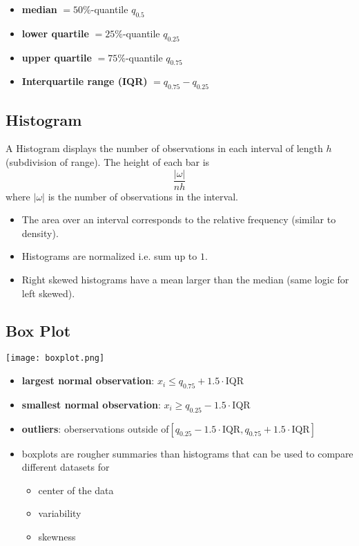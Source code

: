 \newpar{}
\begin{itemize}
    \item \textbf{median} $= 50\%$-quantile $q_{0.5}$
    \item \textbf{lower quartile} $= 25\%$-quantile $q_{0.25}$
    \item \textbf{upper quartile} $= 75\%$-quantile $q_{0.75}$
    \item \textbf{Interquartile range (IQR)} $= q_{0.75} - q_{0.25}$
\end{itemize}

\subsection{Histogram}
A Histogram displays the number of observations in each interval of length $h$ (subdivision of range).
The height of each bar is
\noindent\begin{equation*}
    \frac{|\omega|}{nh}
\end{equation*}
where $|\omega|$ is the number of observations in the interval.
\begin{itemize}
    \item The area over an interval corresponds to the relative frequency (similar to density).
    \item Histograms are normalized i.e. sum up to $1$.
    \item Right skewed histograms have a mean larger than the median (same logic for left skewed).
\end{itemize}

\subsection{Box Plot}
\begin{center}
    \texttt{[image: boxplot.png]}
\end{center}
\begin{itemize}
    \item \textbf{largest normal observation}: $x_i\leq q_{0.75}+1.5\cdot$IQR
    \item \textbf{smallest normal observation}: $x_i\geq q_{0.25}-1.5\cdot$IQR
    \item \textbf{outliers}: oberservations outside of\newline $[q_{0.25}-1.5\cdot\text{IQR},q_{0.75}+1.5\cdot\text{IQR}]$
    \item boxplots are rougher summaries than histograms that can be used to compare different datasets for
          \begin{itemize}
              \item center of the data
              \item variability
              \item skewness
          \end{itemize}
\end{itemize}

